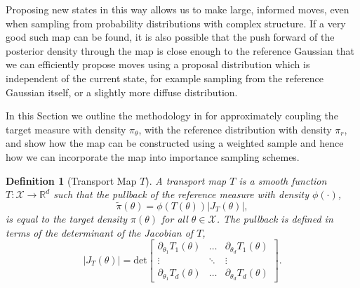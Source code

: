 \documentclass[final]{siamltex}
\newtheorem{dfn}{Definition}[section]
\begin{document}
Proposing new states in this way allows us to make large, informed
moves, even when sampling from probability distributions with complex structure.
If a very good such map can be found, it is also possible that the
push forward of the posterior density through the map is close enough
to the reference Gaussian that we can efficiently
propose moves using a proposal distribution which is independent of
the current state, for example sampling from the reference Gaussian
itself, or a slightly more diffuse distribution.

In this Section we outline the methodology in
\cite{parno2018transport} for approximately coupling the target
measure with density
$\pi_{\theta}$, with the reference distribution with density $\pi_r$, and
show how the map can be constructed using a weighted sample
and hence how we can incorporate the map into importance sampling schemes.

\begin{dfn}[Transport Map $T$]
	A transport map $T$ is a smooth function $T\colon
        \mathcal{X}\rightarrow\mathbb{R}^d$ such that the {\it
          pullback} of the reference measure with density $\phi(\cdot)$,
	\begin{equation}\label{eq:pullback}
		\tilde{\pi}(\theta) = \phi(T(\theta))|J_T(\theta)|,
	\end{equation}
	is equal to the target density $\pi(\theta)$ for all $\theta \in \mathcal{X}$. The pullback is defined in terms of the determinant of the Jacobian of $T$,
	\begin{equation}
		|J_T(\theta)| = \text{det}\begin{bmatrix} \partial_{\theta_1} T_1(\theta) & \dots & \partial_{\theta_d} T_1(\theta) \\ \vdots & \ddots & \vdots \\ \partial_{\theta_1} T_d(\theta) & \dots & \partial_{\theta_d} T_d(\theta) \end{bmatrix}.
	\end{equation}
\end{dfn}

\end{document}
